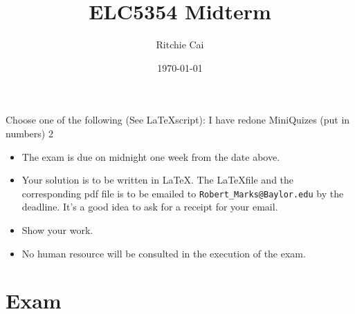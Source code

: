 \documentclass{assignment}
\author{Ritchie Cai}
\title{ELC5354 Midterm}
\date{\today}
\begin{document}
\maketitle

\begin{center}
  Choose one of the following (See \LaTeX script):
  I have redone MiniQuizes (put in numbers) 2
\end{center}

\begin{itemize}
\item The exam is due on midnight one week from the date above.
\item Your solution is to be written in \LaTeX. The \LaTeX file and the corresponding pdf file is to be emailed to \verb"Robert_Marks@Baylor.edu" by the deadline. It's a good idea to ask for a receipt for your email.
\item Show your work.
\item No human resource will be consulted in the execution of the exam.
\end{itemize}

\section*{Exam}







\end{document}
